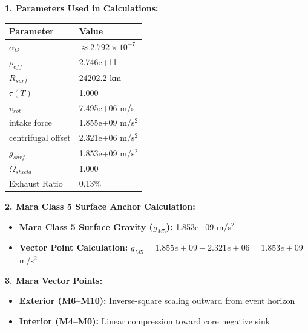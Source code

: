 \documentclass[11pt, a4paper]{article}
\begin{document}
\vspace{0.5em}
\noindent \textbf{1. Parameters Used in Calculations:}
\begin{center}
  \begin{tabular}{|l|l|}
    \hline
    \textbf{Parameter} & \textbf{Value} \\ \hline
    $\alpha_G$ & $\approx 2.792 \times 10^{-7}$ \\ \hline
    $\rho_{eff}$ & 2.746e+11 \\ \hline
    $R_{surf}$ & 24202.2 km \\ \hline
    $\tau(T)$ & 1.000 \\ \hline
    $v_{rot}$ & 7.495e+06 m/s \\ \hline
    intake force & 1.855e+09 m/s$^2$ \\ \hline
    centrifugal offset & 2.321e+06 m/s$^2$ \\ \hline
    $g_{surf}$ & 1.853e+09 m/s$^2$ \\ \hline
    $\Omega_{shield}$ & 1.000 \\ \hline
    Exhaust Ratio & 0.13\% \\ \hline
  \end{tabular}
\end{center}

\vspace{0.5em}
\noindent \textbf{2. Mara Class 5 Surface Anchor Calculation:}
\begin{itemize}
  \item \textbf{Mara Class 5 Surface Gravity ($g_{M5}$):} 1.853e+09 m/s$^2$
  \item \textbf{Vector Point Calculation:} $g_{M5} = 1.855e+09 - 2.321e+06 = 1.853e+09$ m/s$^2$
\end{itemize}

\vspace{0.5em}
\noindent \textbf{3. Mara Vector Points:}
\begin{itemize}
  \item \textbf{Exterior (M6--M10):} Inverse-square scaling outward from event horizon
  \item \textbf{Interior (M4--M0):} Linear compression toward core negative sink
\end{itemize}
\end{document}
